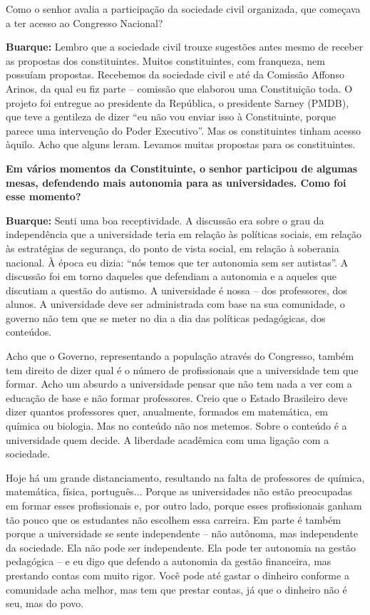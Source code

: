 Como o senhor avalia a participação da sociedade civil organizada, que
começava a ter acesso ao Congresso Nacional?

\textbf{Buarque:} Lembro que a sociedade civil trouxe sugestões antes
mesmo de receber as propostas dos constituintes. Muitos constituintes,
com franqueza, nem possuíam propostas. Recebemos da sociedade civil e
até da Comissão Affonso Arinos, da qual eu fiz parte -- comissão que
elaborou uma Constituição toda. O projeto foi entregue ao presidente da
República, o presidente Sarney (PMDB), que teve a gentileza de dizer
``eu não vou enviar isso à Constituinte, porque parece uma intervenção
do Poder Executivo''. Mas os constituintes tinham acesso àquilo. Acho
que alguns leram. Levamos muitas propostas para os constituintes.

\textbf{Em vários momentos da Constituinte, o senhor participou de
algumas mesas, defendendo mais autonomia para as universidades. Como foi
esse momento?}

\textbf{Buarque:} Senti uma boa receptividade. A discussão era sobre o
grau da independência que a universidade teria em relação às políticas
sociais, em relação às estratégias de segurança, do ponto de vista
social, em relação à soberania nacional. À época eu dizia: ``nós temos
que ter autonomia sem ser autistas''. A discussão foi em torno daqueles
que defendiam a autonomia e a aqueles que discutiam a questão do
autismo. A universidade é nossa -- dos professores, dos alunos. A
universidade deve ser administrada com base na sua comunidade, o governo
não tem que se meter no dia a dia das políticas pedagógicas, dos
conteúdos.

Acho que o Governo, representando a população através do Congresso,
também tem direito de dizer qual é o número de profissionais que a
universidade tem que formar. Acho um absurdo a universidade pensar que
não tem nada a ver com a educação de base e não formar professores.
Creio que o Estado Brasileiro deve dizer quantos professores quer,
anualmente, formados em matemática, em química ou biologia. Mas no
conteúdo não nos metemos. Sobre o conteúdo é a universidade quem decide.
A liberdade acadêmica com uma ligação com a sociedade.

Hoje há um grande distanciamento, resultando na falta de professores de
química, matemática, física, português... Porque as universidades não
estão preocupadas em formar esses profissionais e, por outro lado,
porque esses profissionais ganham tão pouco que os estudantes não
escolhem essa carreira. Em parte é também porque a universidade se sente
independente -- não autônoma, mas independente da sociedade. Ela não
pode ser independente. Ela pode ter autonomia na gestão pedagógica -- e
eu digo que defendo a autonomia da gestão financeira, mas prestando
contas com muito rigor. Você pode até gastar o dinheiro conforme a
comunidade acha melhor, mas tem que prestar contas, já que o dinheiro
não é seu, mas do povo.

